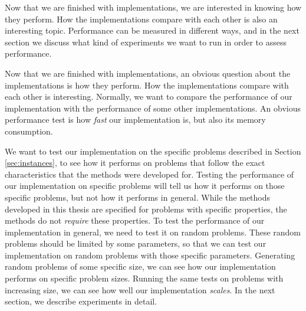 Now that we are finished with implementations, we are interested in knowing
how they perform.
How the implementations compare with each other is also an interesting topic.
Performance can be measured in different ways, and in the next section we
discuss what kind of experiments we want to run in order to assess performance.



Now that we are finished with implementations, an obvious question about the
implementations is how they perform. How the implementations compare with
each other is interesting. Normally, we want to compare the performance
of our implementation with the performance of some other implementations.
An obvious performance test is how \emph{fast} our implementation is, but also
its memory consumption.

We want to test our implementation on the specific problems described in
Section \ref{sec:instances}, to see how it performs on problems that follow
the exact characteristics that the methods were developed for.
Testing the performance of our implementation on specific problems will tell us
how it performs on those specific problems, but not how it performs in general.
While the methods developed in this thesis are specified for problems with
specific properties, the methods do not \emph{require} these properties.
To test the performance of our implementation in general, we need to test it
on random problems.
These random problems should be limited by some parameters, so that we can test
our implementation on random problems with those specific parameters.
Generating random problems of some specific size, we can see how our
implementation performs on specific problem sizes. Running the same
tests on problems with increasing size, we can see how well our implementation
\emph{scales}. In the next section, we describe experiments in detail.
